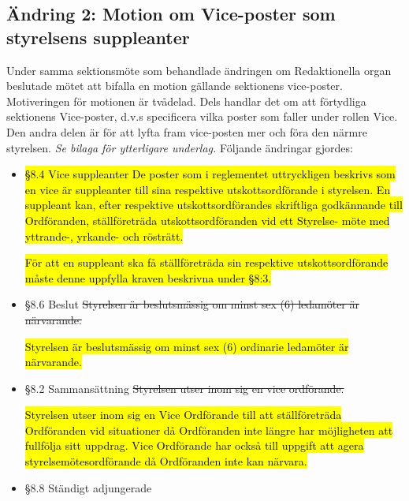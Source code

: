 \documentclass[10pt]{article}
\begin{document}
\subsection*{Ändring 2: Motion om Vice-poster som styrelsens suppleanter}
Under samma sektionsmöte som behandlade ändringen om Redaktionella organ beslutade mötet att bifalla en motion gällande sektionens vice-poster. Motiveringen för motionen är tvådelad. Dels handlar det om att förtydliga sektionens Vice-poster, d.v.s specificera vilka poster som faller under rollen Vice. Den andra delen är för att lyfta fram vice-posten mer och föra den närmre styrelsen. \textit{Se bilaga för ytterligare underlag.} Följande ändringar gjordes:
\begin{itemize}
    \item \hl{\S 8.4 Vice suppleanter De poster som i reglementet uttryckligen beskrivs som en vice är suppleanter till sina respektive utskottsordförande i styrelsen. En suppleant kan, efter respektive utskottsordförandes skriftliga godkännande till Ordföranden, ställföreträda utskottsordföranden vid ett Styrelse- möte med yttrande-, yrkande- och rösträtt.}

    \hl{För att en suppleant ska få ställföreträda sin respektive utskottsordförande måste denne uppfylla kraven beskrivna under \S8:3.}

    \item \S8.6 Beslut \sout{Styrelsen är beslutsmässig om minst sex (6) ledamöter är närvarande.}
    
    \hl{Styrelsen är beslutsmässig om minst sex (6) ordinarie ledamöter är närvarande.}

    \item \S8.2 Sammansättning \sout{Styrelsen utser inom sig en vice ordförande.}

    \hl{Styrelsen utser inom sig en Vice Ordförande till att ställföreträda Ordföranden vid situationer
    då Ordföranden inte längre har möjligheten att fullfölja sitt uppdrag. Vice Ordförande har
    också till uppgift att agera styrelsemötesordförande då Ordföranden inte kan närvara.}

    \item \S8.8 Ständigt adjungerade 
    

\end{itemize}
\end{document}
